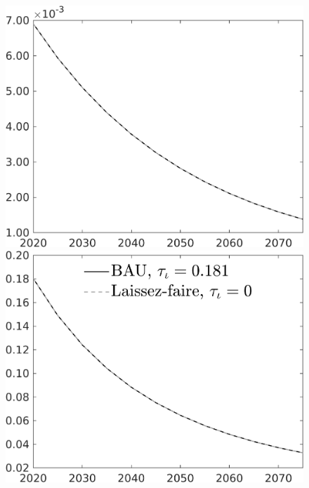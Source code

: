 \documentclass[12pt]{article}
\begin{document}
\begin{figure}[h!!]
\begin{minipage}[]{0.32\textwidth}
	\end{minipage}
	\begin{minipage}[]{0.32\textwidth}
		\includegraphics[width=1\textwidth]{../../codding_model/own_basedOnFried/optimalPol_010922_revision/figures/all_13Sept22/CompTaul_Equlab_LFBAU_Reg0_AgAf_spillover0_nsk1_xgr0_knspil1_sep1_countec0_GovRev0_etaa0.79_lgd0.png}
	\end{minipage}
	\begin{minipage}[]{0.32\textwidth}
		\includegraphics[width=1\textwidth]{../../codding_model/own_basedOnFried/optimalPol_010922_revision/figures/all_13Sept22/CompTaul_Equlab_LFBAU_Reg0_pf_spillover0_nsk1_xgr0_knspil1_sep1_countec0_GovRev0_etaa0.79_lgd1.png}

\end{minipage}
\end{figure}
\end{document}
